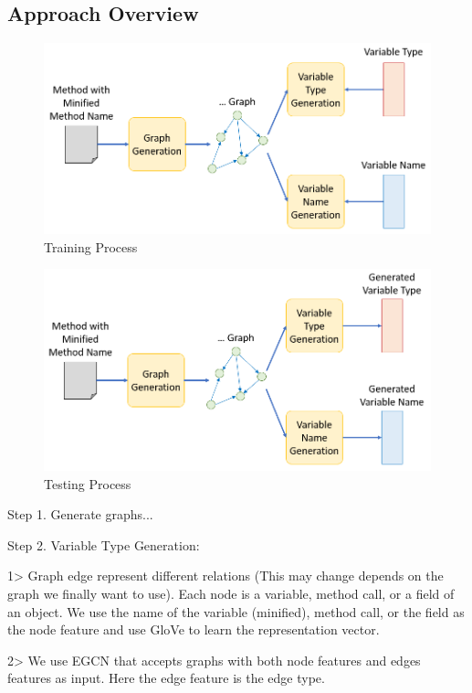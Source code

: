 \subsection{Approach Overview}


\begin{figure}[t]
	\begin{center}
		\includegraphics[width=.7\columnwidth]{figures/training.png}
		\caption{Training Process}
		\label{training_process}
	\end{center}
\end{figure}

\begin{figure}[t]
	\begin{center}
		\includegraphics[width=.7\columnwidth]{figures/testing.png}
		\caption{Testing Process}
		\label{testing_process}
	\end{center}
\end{figure}

Step 1. Generate graphs...

Step 2. Variable Type Generation:

1> Graph edge represent different relations (This may change depends on the graph we finally want to use). Each node is a variable, method call, or a field of an object. We use the name of the variable (minified), method call, or the field as the node feature and use GloVe to learn the representation vector.

2> We use EGCN that accepts graphs with both node features and edges features as input. Here the edge feature is the edge type. 

